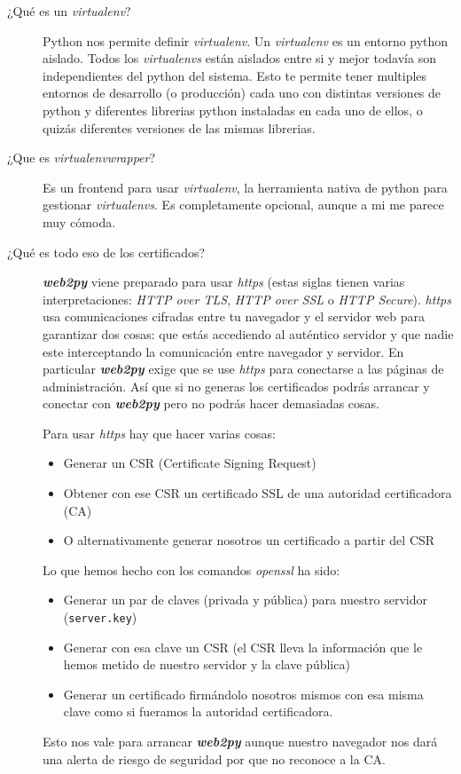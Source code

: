 \documentclass[
  12pt,
  spanish,
]{article}
\providecommand{\tightlist}{%
  \setlength{\itemsep}{0pt}\setlength{\parskip}{0pt}}
\begin{document}
\begin{description}
\item[¿Qué es un \emph{virtualenv}?]
Python nos permite definir \emph{virtualenv}. Un \emph{virtualenv} es un
entorno python aislado. Todos los \emph{virtualenvs} están aislados
entre si y mejor todavía son independientes del python del sistema. Esto
te permite tener multiples entornos de desarrollo (o producción) cada
uno con distintas versiones de python y diferentes librerias python
instaladas en cada uno de ellos, o quizás diferentes versiones de las
mismas librerias.
\item[¿Que es \emph{virtualenvwrapper}?]
Es un frontend para usar \emph{virtualenv}, la herramienta nativa de
python para gestionar \emph{virtualenvs}. Es completamente opcional,
aunque a mi me parece muy cómoda.
\item[¿Qué es todo eso de los certificados?]
\textbf{\emph{web2py}} viene preparado para usar \emph{https} (estas
siglas tienen varias interpretaciones: \emph{HTTP over TLS}, \emph{HTTP
over SSL} o \emph{HTTP Secure}). \emph{https} usa comunicaciones
cifradas entre tu navegador y el servidor web para garantizar dos cosas:
que estás accediendo al auténtico servidor y que nadie este
interceptando la comunicación entre navegador y servidor. En particular
\textbf{\emph{web2py}} exige que se use \emph{https} para conectarse a
las páginas de administración. Así que si no generas los certificados
podrás arrancar y conectar con \textbf{\emph{web2py}} pero no podrás
hacer demasiadas cosas.

Para usar \emph{https} hay que hacer varias cosas:

\begin{itemize}
\tightlist
\item
  Generar un CSR (Certificate Signing Request)
\item
  Obtener con ese CSR un certificado SSL de una autoridad certificadora
  (CA)
\item
  O alternativamente generar nosotros un certificado a partir del CSR
\end{itemize}

Lo que hemos hecho con los comandos \emph{openssl} ha sido:

\begin{itemize}
\tightlist
\item
  Generar un par de claves (privada y pública) para nuestro servidor
  (\texttt{server.key})
\item
  Generar con esa clave un CSR (el CSR lleva la información que le hemos
  metido de nuestro servidor y la clave pública)
\item
  Generar un certificado firmándolo nosotros mismos con esa misma clave
  como si fueramos la autoridad certificadora.
\end{itemize}

Esto nos vale para arrancar \textbf{\emph{web2py}} aunque nuestro
navegador nos dará una alerta de riesgo de seguridad por que no reconoce
a la CA.
\end{description}
\end{document}
